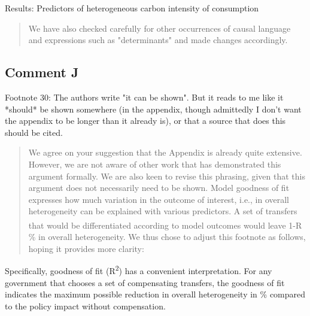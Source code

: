 \documentclass[11pt]{article}
\newenvironment{response}
{\begin{quote}\color{black}}
{\end{quote}}
\begin{document}
\begin{revisionbox}
    Results: Predictors of heterogeneous carbon intensity of consumption
\end{revisionbox}

\begin{response}
    We have also checked carefully for other occurrences of causal language and expressions such as "determinants" and made changes accordingly.
\end{response}

\subsection*{Comment J}\label{comment_R1_J}

\begin{commentbox}
    Footnote 30: The authors write "it can be shown". But it reads to me like it *should* be shown somewhere (in the appendix, though admittedly I don't want the appendix to be longer than it already is), or that a source that does this should be cited.
\end{commentbox}

\begin{response}
    We agree on your suggestion that the Appendix is already quite extensive. However, we are not aware of other work that has demonstrated this argument formally. We are also keen to revise this phrasing, given that this argument does not necessarily need to be shown. Model goodness of fit expresses how much variation in the outcome of interest, i.e., in overall heterogeneity can be explained with various predictors. A set of transfers that would be differentiated according to model outcomes would leave 1-R\textsuperscript{} \% in overall heterogeneity. We thus chose to adjust this footnote as follows, hoping it provides more clarity:
\end{response}

\begin{revisionbox}
    Specifically, goodness of fit (R\textsuperscript{2}) has a convenient interpretation. For any government that chooses a set of compensating transfers, the goodness of fit indicates the maximum possible reduction in overall heterogeneity in \% compared to the policy impact without compensation.
\end{revisionbox}
\end{document}
